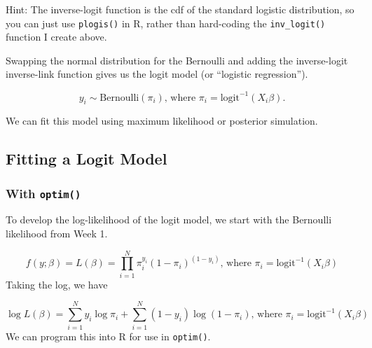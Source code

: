 \documentclass[
]{book}
\begin{document}
Hint: The inverse-logit function is the cdf of the standard logistic
distribution, so you can just use \texttt{plogis()} in R, rather than
hard-coding the \texttt{inv\_logit()} function I create above.

Swapping the normal distribution for the Bernoulli and adding the
inverse-logit inverse-link function gives us the logit model (or
``logistic regression'').

\[
y_i \sim \text{Bernoulli}(\pi_i)\text{, where } \pi_i = \text{logit}^{-1}(X_i\beta).
\]

We can fit this model using maximum likelihood or posterior simulation.

\hypertarget{fitting-a-logit-model}{%
\subsection{Fitting a Logit Model}\label{fitting-a-logit-model}}

\hypertarget{with-optim}{%
\subsubsection{\texorpdfstring{With
\texttt{optim()}}{With optim()}}\label{with-optim}}

To develop the log-likelihood of the logit model, we start with the
Bernoulli likelihood from Week 1.

\[
f(y; \beta) = L(\beta) = \prod_{i = 1}^{N}\pi_i^{y_i} (1 - \pi_i)^{(1 - y_i)}\text{, where } \pi_i = \text{logit}^{-1}(X_i\beta)
\] Taking the log, we have

\[
\log L(\beta) = \sum_{i = 1}^{N} y_i \log \pi_i +  \sum_{i = 1}^{N}(1 - y_i) \log(1 - \pi_i)\text{, where } \pi_i = \text{logit}^{-1}(X_i\beta)
\] We can program this into R for use in \texttt{optim()}.
\end{document}

